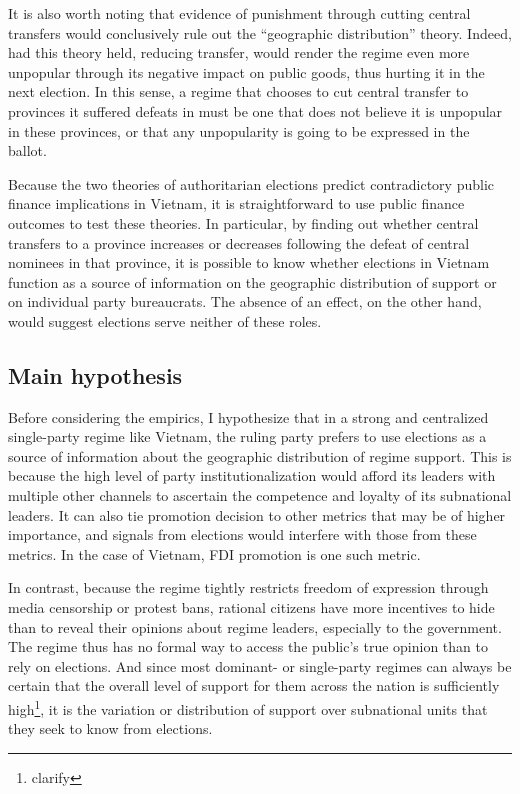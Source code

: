 \documentclass[12pt]{article}\usepackage[]{graphicx}\usepackage[]{color}
\newcommand{\1}{\mathbbm{1}}
\begin{document}
It is also worth noting that evidence of punishment through cutting central transfers would conclusively rule out the ``geographic distribution'' theory. Indeed, had this theory held, reducing transfer, would render the regime even more unpopular through its negative impact on public goods, thus hurting it in the next election. In this sense, a regime that chooses to cut central transfer to provinces it suffered defeats in must be one that does not believe it is unpopular in these provinces, or that any unpopularity is going to be expressed in the ballot.



Because the two theories of authoritarian elections predict contradictory public finance implications in Vietnam, it is straightforward to use public finance outcomes to test these theories. In particular, by finding out whether central transfers to a province increases or decreases following the defeat of central nominees in that province, it is possible to know whether elections in Vietnam function as a source of information on the geographic distribution of support or on individual party bureaucrats. The absence of an effect, on the other hand, would suggest elections serve neither of these roles.

\subsection{Main hypothesis}
Before considering the empirics, I hypothesize that in a strong and centralized single-party regime like Vietnam, the ruling party prefers to use elections as a source of information about the geographic distribution of regime support. This is because the high level of party institutionalization would afford its leaders with multiple other channels to ascertain the competence and loyalty of its subnational leaders. It can also tie promotion decision to other metrics that may be of higher importance, and signals from elections would interfere with those from these metrics. In the case of Vietnam, FDI promotion \citep{JensenMalesky2015} is one such metric. 

In contrast, because the regime tightly restricts freedom of expression through media censorship or protest bans, rational citizens have more incentives to hide than to reveal their opinions about regime leaders, especially to the government. The regime thus has no formal way to access the public's true opinion than to rely on elections. And since most dominant- or single-party regimes can always be certain that the overall level of support for them across the nation is sufficiently high\footnote{clarify}, it is the variation or distribution of support over subnational units that they seek to know from elections.
\end{document}

